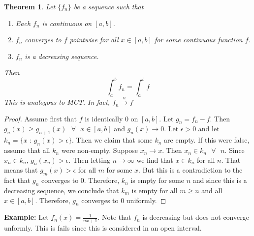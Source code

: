 \documentclass{article}
\newtheorem{theorem}{Theorem}
\begin{document}
\begin{theorem}
    Let $\{f_n\}$ be a sequence such that 
    \begin{enumerate}
        \item Each $f_n$ is continuous on $[a,b]$.
        \item $f_n$ converges to $f$ pointwise for all $x\in[a,b]$ for some continuous function $f$.
        \item $f_n$ is a decreasing sequence.
    \end{enumerate}
    Then $$\int_a^b f_n=\int_a^b f$$
    This is analogous to MCT. In fact, $f_n\xrightarrow{u}f$
\end{theorem}
\begin{proof}
    Assume first that $f$ is identically 0 on $[a,b]$. Let $g_n=f_n-f$. Then $g_n(x)\geq g_{n+1}(x)\text{ }\forall \text{ }x\in[a,b]$ and $g_n(x)\to 0$. Let $\epsilon>0$ and let$k_n=\{x \text{ : }g_n(x)>\epsilon \}$. Then we claim that some $k_n$ are empty. If this were false, assume that all $k_n$ were non-empty. Suppose $x_n\to x$. Then $x_n\in k_n \text{ }\forall\text{ }n$. Since $x_n\in k_n$, $g_n(x_n)>\epsilon$. Then letting $n\to\infty$ we find that $x\in k_n$ for all $n$. That means that $g_m(x)>\epsilon$ for all $m$ for some $x$. But this is a contradiction to the fact that $g_n$ converges to 0. Therefore, $k_n$ is empty for some $n$ and since this is a decreasing sequence, we conclude that $k_m$ is empty for all $m\geq n$ and all $x\in [a,b]$. Therefore, $g_n$ converges to 0 uniformly. 
 \end{proof}
\textbf{Example: }Let $f_n(x)=\frac{1}{nx+1}$. Note that $f_n$ is decreasing but does not converge unformly. This is fails since this is considered in an open interval. 
\end{document}
